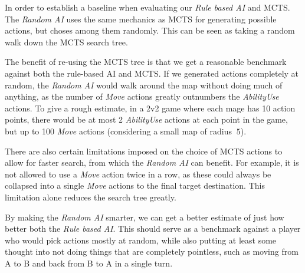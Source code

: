 In order to establish a baseline when evaluating our \emph{Rule based AI} and MCTS.
The \emph{Random AI} uses the same mechanics as MCTS for generating possible actions,
but choses among them randomly. This can be seen as taking a random walk down
the MCTS search tree.

The benefit of re-using the MCTS tree is that we get a reasonable benchmark against
both the rule-based AI and MCTS. If we generated actions completely at random, the \emph{Random AI}
would walk around the map without doing much of anything, as the number of \emph{Move} actions
greatly outnumbers the \emph{AbilityUse} actions. To give a rough estimate, in a 2v2 game where
each mage has 10 action points, there would be at most 2 \emph{AbilityUse} actions at each point
in the game, but up to 100 \emph{Move} actions (considering a small map of radius $~5$).

There are also certain limitations imposed on the choice of MCTS actions to allow for faster search,
from which the \emph{Random AI} can benefit. For example, it is not allowed to use a \emph{Move}
action twice in a row, as these could always be collapsed into a single \emph{Move} actions to the
final target destination. This limitation alone reduces the search tree greatly.

By making the \emph{Random AI} smarter, we can get a better estimate of just how better
both the \emph{Rule based AI}. This should serve as a benchmark against a player who would
pick actions mostly at random, while also putting at least some thought into not doing things
that are completely pointless, such as moving from A to B and back from B to A in a single turn.